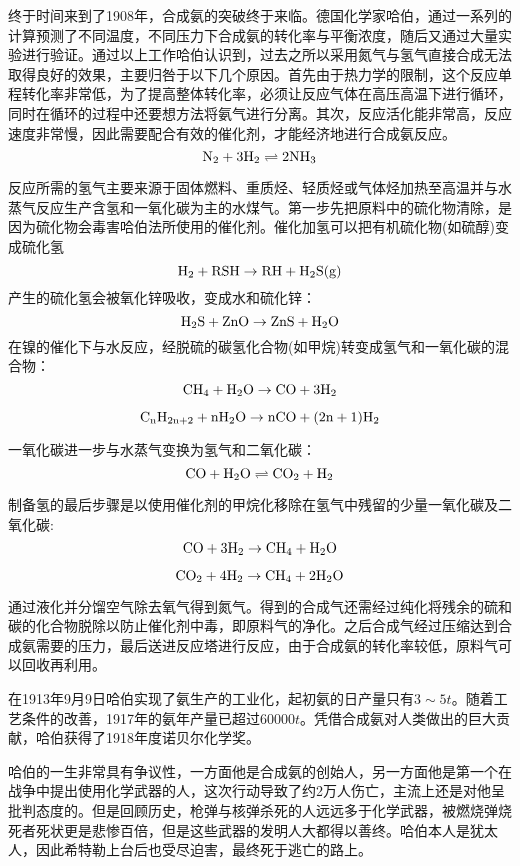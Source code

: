 \documentclass{article}
\begin{document}
终于时间来到了1908年，合成氨的突破终于来临。德国化学家哈伯，通过一系列的计算预测了不同温度，不同压力下合成氨的转化率与平衡浓度，随后又通过大量实验进行验证。通过以上工作哈伯认识到，过去之所以采用氮气与氢气直接合成无法取得良好的效果，主要归咎于以下几个原因。首先由于热力学的限制，这个反应单程转化率非常低，为了提高整体转化率，必须让反应气体在高压高温下进行循环，同时在循环的过程中还要想方法将氨气进行分离。其次，反应活化能非常高，反应速度非常慢，因此需要配合有效的催化剂，才能经济地进行合成氨反应。
$$
\rm N_2 +3H_2\rightleftharpoons  2NH_3
$$

反应所需的氢气主要来源于固体燃料、重质烃、轻质烃或气体烃加热至高温并与水蒸气反应生产含氢和一氧化碳为主的水煤气。第一步先把原料中的硫化物清除，是因为硫化物会毒害哈伯法所使用的催化剂。催化加氢可以把有机硫化物(如硫醇)变成硫化氢
$$
\rm H_2+ RSH \rightarrow RH + H_2S(g)
$$
产生的硫化氢会被氧化锌吸收，变成水和硫化锌：
$$
\rm H_2S+ZnO\rightarrow ZnS+H_2O
$$
在镍的催化下与水反应，经脱硫的碳氢化合物(如甲烷)转变成氢气和一氧化碳的混合物：
$$
\rm CH_4+ H_2O \rightarrow CO + 3 H_2
$$

$$
\rm C_nH_{2n+2}+nH_2O\rightarrow nCO+(2n+1)H_2
$$

一氧化碳进一步与水蒸气变换为氢气和二氧化碳：
$$
\rm CO + H_2O \rightleftharpoons CO_2+ H_2
$$

制备氢的最后步骤是以使用催化剂的甲烷化移除在氢气中残留的少量一氧化碳及二氧化碳:
$$
\rm CO+3H_2\rightarrow CH_4+H_2O
$$

$$
\rm CO_2+4H_2\rightarrow CH_4+2H_2O
$$

通过液化并分馏空气除去氧气得到氮气。得到的合成气还需经过纯化将残余的硫和碳的化合物脱除以防止催化剂中毒，即原料气的净化。之后合成气经过压缩达到合成氨需要的压力，最后送进反应塔进行反应，由于合成氨的转化率较低，原料气可以回收再利用。

在1913年9月9日哈伯实现了氨生产的工业化，起初氨的日产量只有$3\sim5t$。随着工艺条件的改善，1917年的氨年产量已超过$60000t$。凭借合成氨对人类做出的巨大贡献，哈伯获得了1918年度诺贝尔化学奖。

哈伯的一生非常具有争议性，一方面他是合成氨的创始人，另一方面他是第一个在战争中提出使用化学武器的人，这次行动导致了约2万人伤亡，主流上还是对他呈批判态度的。但是回顾历史，枪弹与核弹杀死的人远远多于化学武器，被燃烧弹烧死者死状更是悲惨百倍，但是这些武器的发明人大都得以善终。哈伯本人是犹太人，因此希特勒上台后也受尽迫害，最终死于逃亡的路上。
\end{document}
